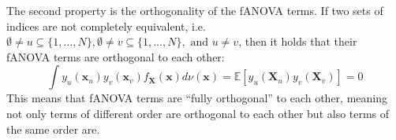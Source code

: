 The second property is the orthogonality of the fANOVA terms. If two sets of indices are not completely equivalent, i.e. $\emptyset \neq u \subseteq \{1, \dots, N\}, \emptyset \neq v \subseteq \{1, \dots, N\}, \text{ and } u \neq v$, then it holds that their fANOVA terms are orthogonal to each other:
\begin{equation}
    \int y_u(\boldsymbol{x}_u) y_v(\boldsymbol{x}_v) f_{\boldsymbol{X}}(\boldsymbol{x}) d\nu (\boldsymbol{x}) = \mathbb{E}[y_u(\boldsymbol{X}_u) y_v(\boldsymbol{X}_v)] = 0
    \label{eq:orthogonality}
\end{equation}
This means that fANOVA terms are ``fully orthogonal'' to each other, meaning not only terms of different order are orthogonal to each other but also terms of the same order are.



